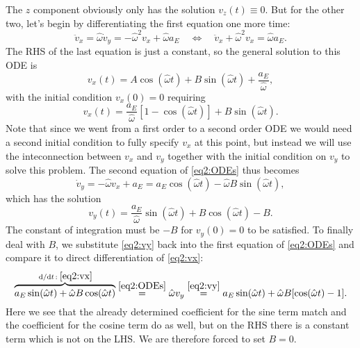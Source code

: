 \documentclass[11pt,a4paper, 
swedish, english %
]{article}
\begin{document}
The $z$ component obviously only has the solution $v_z(t)\equiv0$. But
for the other two, let's begin by differentiating the first equation
one more time:
\begin{equation}
\ddot{v}_x = \hat\omega \dot{v}_y
=-\hat\omega^2 {v}_x + \hat\omega a_E
\quad\Longleftrightarrow\quad
\ddot{v}_x + \hat\omega^2 {v}_x = \hat\omega a_E.
\end{equation}
The RHS of the last equation is just a constant, so the general
solution to this ODE is
\begin{equation}
v_x(t) = A\cos(\hat\omega t) + B\sin(\hat\omega t) 
+ \frac{a_E}{\hat\omega},
\end{equation}
with the initial condition $v_x(0)=0$ requiring
\begin{equation}\label{eq2:vx}
v_x(t) = \frac{a_E}{\hat\omega}[1-\cos(\hat\omega t)]
 + B\sin(\hat\omega t).
\end{equation}
Note that since we went from a first order to a second order ODE we
would need a second initial condition to fully specify $v_x$ at this
point, but instead we will use the inteconnection between $v_x$ and
$v_y$ together with the initial condition on $v_y$ to solve this
problem. The second equation of \eqref{eq2:ODEs} thus becomes
\begin{equation}
\dot{v}_y = -\hat\omega v_x + a_E
=a_E\cos(\hat\omega t)
 - \hat\omega B\sin(\hat\omega t),
\end{equation}
which has the solution 
\begin{equation}\label{eq2:vy}
v_y(t) = \frac{a_E}{\hat\omega}\sin(\hat\omega t)
+B\cos(\hat\omega t) -B.
\end{equation}
The constant of integration must be $-B$ for $v_y(0)=0$ to be
satisfied. To finally deal with $B$, we substitute \eqref{eq2:vy} back
into the first equation of \eqref{eq2:ODEs} and compare it to direct
differentiation of \eqref{eq2:vx}:
\begin{equation}
\overbrace{a_E\sin(\hat\omega t) + \hat\omega B\cos(\hat\omega t)}
^{\dv*{t}:\;\eqref{eq2:vx}}
\stackrel{\eqref{eq2:ODEs}}{=}
\hat\omega v_y
\stackrel{\eqref{eq2:vy}}{=}
a_E\sin(\hat\omega t)
+\hat\omega B [\cos(\hat\omega t)-1].
\end{equation}
Here we see that the already determined coefficient for the sine term
match and the coefficient for the cosine term do as well, but on the
RHS there is a constant term which is not on the LHS. We are therefore
forced to set $B=0$. 
\end{document}
